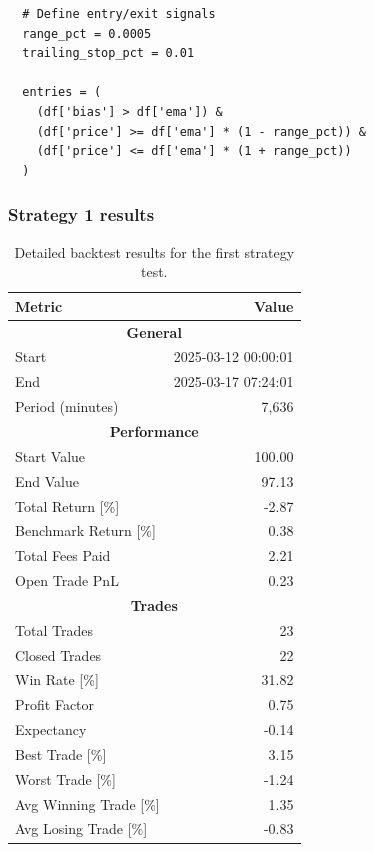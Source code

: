 \documentclass[12pt]{article}
\begin{document}
\begin{verbatim}
  # Define entry/exit signals
  range_pct = 0.0005
  trailing_stop_pct = 0.01

  entries = (
    (df['bias'] > df['ema']) &
    (df['price'] >= df['ema'] * (1 - range_pct)) &
    (df['price'] <= df['ema'] * (1 + range_pct))
  )

\end{verbatim}

\subsubsection{Strategy 1 results}

\begin{table}[H]
  \centering
  \caption{Detailed backtest results for the first strategy test.}
  \label{tab:strategy_1_detailed_results}
  \small
  \begin{tabular}{@{}lr@{}}
    \toprule
    \textbf{Metric} & \textbf{Value} \\
    \midrule
    \multicolumn{2}{c}{\textbf{General}} \\
    \midrule
    Start                         & 2025-03-12 00:00:01 \\
    End                           & 2025-03-17 07:24:01 \\
    Period (minutes)              & 7,636 \\
    \midrule
    \multicolumn{2}{c}{\textbf{Performance}} \\
    \midrule
    Start Value                   & 100.00 \\
    End Value                     & 97.13 \\
    Total Return [\%]             & -2.87 \\
    Benchmark Return [\%]         & 0.38 \\
    Total Fees Paid               & 2.21 \\
    Open Trade PnL                & 0.23 \\
    \midrule
    
    

    \multicolumn{2}{c}{\textbf{Trades}} \\
    \midrule
    Total Trades                  & 23 \\
    Closed Trades                 & 22 \\
    Win Rate [\%]                 & 31.82 \\
    Profit Factor                 & 0.75 \\
    Expectancy                    & -0.14 \\
    Best Trade [\%]               & 3.15 \\
    Worst Trade [\%]              & -1.24 \\
    Avg Winning Trade [\%]        & 1.35 \\
    Avg Losing Trade [\%]         & -0.83 \\
    
    \bottomrule
  \end{tabular}
\end{table}
\end{document}
